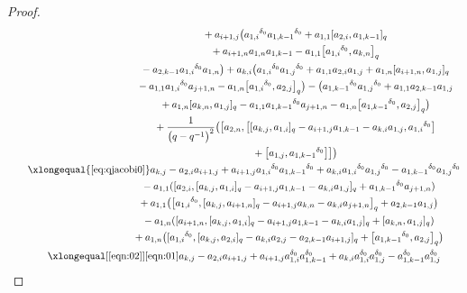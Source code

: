 \documentclass[pdftex]{sigma}
\numberwithin{equation}{section}
\def\d{\delta}
\begin{document}
\begin{proof}
\begin{gather*}
 \phantom{\qquad \xlongequal{\qquad}\quad\ }{} +a_{i+1,j} \bigl({a_{1,i}}^{\d_0}{a_{1,k-1}}^{\d_0}+a_{1,1} [a_{2,i},a_{1,k-1} ]_q\\
 \phantom{\qquad \xlongequal{\qquad}\quad\ }{}
+a_{i+1,n}a_{1,n}a_{1,k-1} -a_{1,1} \bigl[{a_{1,i}}^{\d_0},a_{k,n} \bigr]_q \\
 \phantom{\qquad \xlongequal{\qquad}\quad\ }{} -a_{2,k-1}{a_{1,i}}^{\d_0}a_{1,n} \bigr)+a_{k,i} \bigl({a_{1,i}}^{\d_0}{a_{1,j}}^{\d_0}+a_{1,1}a_{2,i}a_{1,j} +a_{1,n} [a_{i+1,n},a_{1,j} ]_q \\
 \phantom{\qquad \xlongequal{\qquad}\quad\ }{} -a_{1,1}{a_{1,i}}^{\d_0}a_{j+1,n} -a_{1,n} \bigl[{a_{1,i}}^{\d_0},a_{2,j} \bigr]_q \bigr)- \bigl({a_{1,k-1}}^{\d_0}{a_{1,j}}^{\d_0} +a_{1,1}a_{2,k-1}a_{1,j}\\
 \phantom{\qquad \xlongequal{\qquad}\quad\ }{}
+a_{1,n} [a_{k,n},a_{1,j} ]_q -a_{1,1}{a_{1,k-1}}^{\d_0}a_{j+1,n} -a_{1,n} \bigl[{a_{1,k-1}}^{\d_0},a_{2,j} \bigr]_q \bigr)\\
 \phantom{\qquad \xlongequal{\qquad}\quad\ }{} +\frac{1}{ \bigl(q-q^{-1}\bigr)^2} \bigl( \bigl[a_{2,n}, \bigl[ [a_{k,j},a_{1,i} ]_q-a_{i+1,j}a_{1,k-1} -a_{k,i}a_{1,j}, {a_{1,i}}^{\d_0} \bigr]\\
 \phantom{\qquad \xlongequal{\qquad}\quad\ }{} + \bigl[a_{1,j}, {a_{1,k-1}}^{\d_0} \bigr] \bigr] \bigr)\\
 \qquad\xlongequal{\eqref{eq:qjacobi0}} a_{k,j}-a_{2,i}a_{i+1,j} +a_{i+1,j}{a_{1,i}}^{\d_0} {a_{1,k-1}}^{\d_0} +a_{k,i}{a_{1,i}}^{\d_0}{a_{1,j}}^{\d_0}-{a_{1,k-1}}^{\d_0}{a_{1,j}}^{\d_0}\\
 \phantom{\qquad \xlongequal{\qquad}}{} -a_{1,1} ( [a_{2,i}, [a_{k,j},a_{1,i} ]_q -a_{i+1,j}a_{1,k-1}-a_{k,i}a_{1,j} ]_q+{a_{1,k-1}}^{\d_0}a_{j+1,n} )\\
 \phantom{\qquad \xlongequal{\qquad}}{} +a_{1,1} \bigl( \bigl[{a_{1,i}}^{\d_0}, [a_{k,j},a_{i+1,n} ]_q -a_{i+1,j}a_{k,n} -a_{k,i}a_{j+1,n} \bigr]_q+a_{2,k-1}a_{1,j} \bigr) \\
 \phantom{\qquad \xlongequal{\qquad}}{} -a_{1,n} ( [a_{i+1,n}, [a_{k,j},a_{1,i} ]_q -a_{i+1,j}a_{1,k-1}-a_{k,i}a_{1,j} ]_q + [a_{k,n},a_{1,j} ]_q )\\
 \phantom{\qquad \xlongequal{\qquad}}{} +a_{1,n} \bigl( [{a_{1,i}}^{\d_0}, [a_{k,j},a_{2,i} ]_q -a_{k,i}a_{2,j} -a_{2,k-1}a_{i+1,j} ]_q + \bigl[{a_{1,k-1}}^{\d_0},a_{2,j} \bigr]_q \bigr)\\
 \qquad\xlongequal[\eqref{eqn:02}]{\eqref{eqn:01}}
 a_{k,j}-a_{2,i}a_{i+1,j}+a_{i+1,j}a_{1,i}^{\d_0}a_{1,k-1}^{\d_0} +a_{k,i} a_{1,i}^{\d_0}a_{1,j}^{\d_0} - a_{1,k-1}^{\d_0}a_{1,j}^{\d_0}\\

\end{gather*}
\end{proof}
\end{document}
